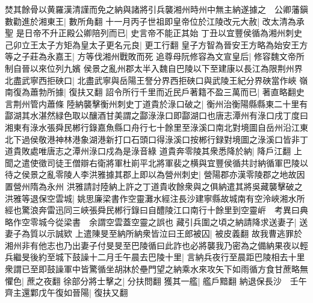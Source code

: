 焚其餘骨以黄羅漢清謹而免之納與諸將引兵襲湘州時州中無主納遂據之　公卿藩鎭數勸進於湘東王|{
	數所角翻}
十一月丙子世祖即皇帝位於江陵改元大赦|{
	改太清為承聖}
是日帝不升正殿公卿陪列而已|{
	史言帝不能正其始}
丁丑以宜豐侯循為湘州刺史己卯立王太子方矩為皇太子更名元良|{
	更工行翻}
皇子方智為晉安王方略為始安王方等之子莊為永嘉王|{
	方等伐湘州戰敗而死}
追尊母阮修容為文宣皇后|{
	修容魏文帝所制自晉以來位列九嬪}
侯景之亂州郡太半入魏自巴陵以下至建康以長江為限荆州界北盡武寧西拒硤口|{
	北盡武寧與岳陽王詧分界西拒硤口與武陵王紀分界硤當作峽}
嶺南復為蕭勃所據|{
	復扶又翻}
詔令所行千里而近民戶著籍不盈三萬而已|{
	著直略翻史言荆州管内蕭條}
陸納襲擊衡州刺史丁道貴於淥口破之|{
	衡州治衡陽縣縣東二十里有酃湖其水湛然緑色取以釀酒甘美謂之酃淥淥口即酃湖口也唐志潭州有淥口戌丁度曰湘東有淥水張舜民郴行錄嘉魚縣口舟行七十餘里至淥溪口南北對境圖自岳州沿江東北下過侯敬港神林港象湖港新打口石頭口得淥溪口按郴行録對境圖之淥溪口皆非丁道貴敗處唯唐志之潭州淥口戍為是淥音綠}
道貴奔零陵其衆悉降於納|{
	降戶江翻}
上聞之遣使徵司徒王僧辯右衛將軍杜崱平北將軍裴之横與宜豐侯循共討納循軍巴陵以待之侯景之亂零陵人李洪雅據其郡上即以為營州刺史|{
	營陽郡亦漢零陵郡之地故因置營州隋為永州}
洪雅請討陸納上許之丁道貴收餘衆與之俱納遣其將吳藏襲擊破之洪雅等退保空雲城|{
	姚思廉梁書作空靈灘水經注長沙建寧縣故城南有空泠峽湘水所經也驚浪奔雷迅同三峽張舜民郴行錄曰自醴陵江口南行十餘里到空靈㟁　考異曰典略作空零城今從梁書　余謂空雲蓋空靈之誤也}
藏引兵圍之頃之納請降求送妻子|{
	送妻子為質以示誠欵}
上遣陳旻至納所納衆皆泣曰王郎被囚|{
	被皮義翻}
故我曹逃罪於湘州非有他志也乃出妻子付旻旻至巴陵循曰此詐也必將襲我乃密為之備納果夜以輕兵繼旻後約至城下鼓譟十二月壬午晨去巴陵十里|{
	言納兵夜行至晨距巴陵相去十里}
衆謂已至即鼓譟軍中皆驚循坐胡牀於壘門望之納乘水來攻矢下如雨循方食甘蔗略無懼色|{
	蔗之夜翻}
徐部分將士擊之|{
	分扶問翻}
獲其一艦|{
	艦戶黯翻}
納退保長沙　壬午齊主還鄴戊午復如晉陽|{
	復扶又翻}


